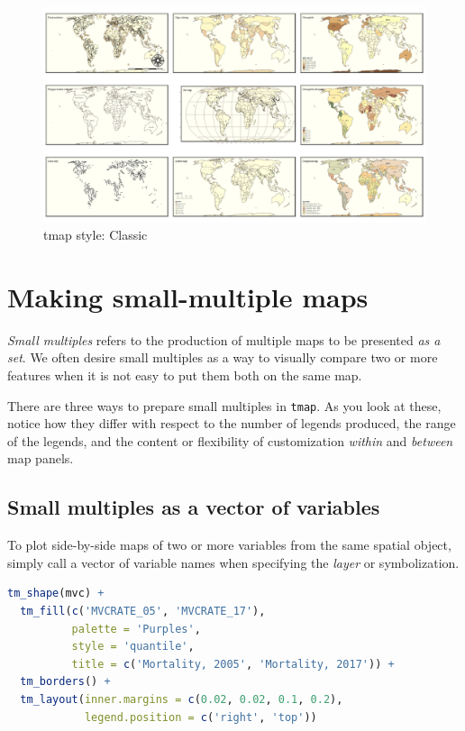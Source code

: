 \documentclass[
]{book}
\newcommand{\passthrough}[1]{#1}
\begin{document}
\begin{figure}
\includegraphics[width=0.5\linewidth]{images/classic} \caption{tmap style: Classic}\label{fig:unnamed-chunk-393}
\end{figure}

\hypertarget{making-small-multiple-maps}{%
\section{Making small-multiple maps}\label{making-small-multiple-maps}}

\emph{Small multiples} refers to the production of multiple maps to be presented \emph{as a set}. We often desire small multiples as a way to visually compare two or more features when it is not easy to put them both on the same map.

There are three ways to prepare small multiples in \passthrough{\lstinline!tmap!}. As you look at these, notice how they differ with respect to the number of legends produced, the range of the legends, and the content or flexibility of customization \emph{within} and \emph{between} map panels.

\hypertarget{small-multiples-as-a-vector-of-variables}{%
\subsection{Small multiples as a vector of variables}\label{small-multiples-as-a-vector-of-variables}}

To plot side-by-side maps of two or more variables from the same spatial object, simply call a vector of variable names when specifying the \emph{layer} or symbolization.

\begin{lstlisting}[language=R]
tm_shape(mvc) + 
  tm_fill(c('MVCRATE_05', 'MVCRATE_17'),
          palette = 'Purples',
          style = 'quantile',
          title = c('Mortality, 2005', 'Mortality, 2017')) +
  tm_borders() +
  tm_layout(inner.margins = c(0.02, 0.02, 0.1, 0.2),
            legend.position = c('right', 'top'))
\end{lstlisting}
\end{document}
